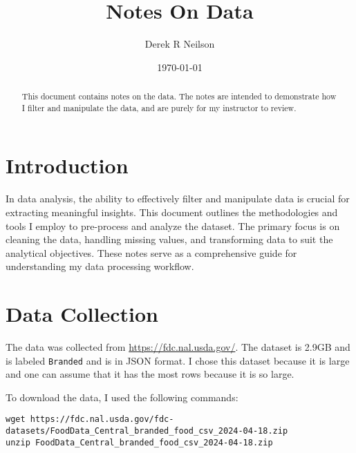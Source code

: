 \documentclass{article}
\title{Notes On Data}
\author{Derek R Neilson}
\date{\today}
\begin{document}
\maketitle

\begin{abstract}
  This document contains notes on the data. The notes are intended to demonstrate how I filter and manipulate the data, and are purely for my instructor to review.
\end{abstract}

\section{Introduction}

In data analysis, the ability to effectively filter and manipulate data is crucial for extracting meaningful insights. This document outlines the methodologies and tools I employ to pre-process and analyze the dataset. The primary focus is on cleaning the data, handling missing values, and transforming data to suit the analytical objectives. These notes serve as a comprehensive guide for understanding my data processing workflow.

\section{Data Collection}
The data was collected from \url{https://fdc.nal.usda.gov/}. The dataset is 2.9GB and is labeled \texttt{Branded} and is in JSON format. I chose this dataset because it is large and one can assume that it has the most rows because it is so large. 

To download the data, I used the following commands: 

\begin{lstlisting}
wget https://fdc.nal.usda.gov/fdc-datasets/FoodData_Central_branded_food_csv_2024-04-18.zip
unzip FoodData_Central_branded_food_csv_2024-04-18.zip 
\end{lstlisting}
\end{document}
